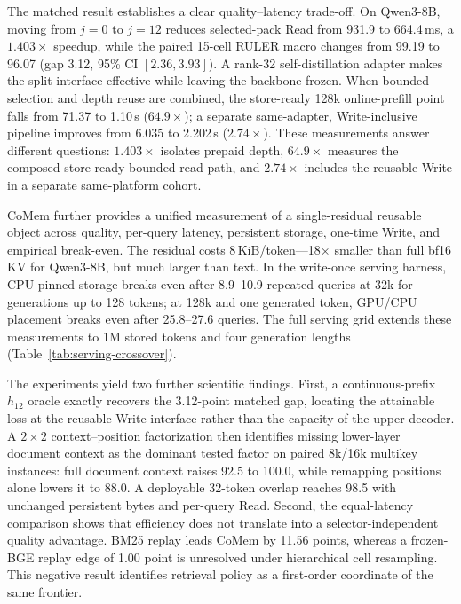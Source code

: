 The matched result establishes a clear quality--latency trade-off. On
Qwen3-8B, moving from $j{=}0$ to $j{=}12$ reduces selected-pack Read from
931.9 to 664.4\,ms, a $1.403\times$ speedup, while the paired 15-cell RULER
macro changes from 99.19 to 96.07 (gap 3.12, 95\% CI $[2.36,3.93]$). A
rank-32 self-distillation adapter makes the split interface effective while
leaving the backbone frozen. When bounded selection and depth reuse are
combined, the store-ready 128k online-prefill point falls from 71.37 to
1.10\,s ($64.9\times$); a separate same-adapter, Write-inclusive pipeline
improves from 6.035 to 2.202\,s ($2.74\times$). These measurements answer
different questions: $1.403\times$ isolates prepaid depth, $64.9\times$
measures the composed store-ready bounded-read path, and $2.74\times$ includes
the reusable Write in a separate same-platform cohort.

CoMem further provides a unified measurement of a
single-residual reusable object across quality, per-query latency, persistent
storage, one-time Write, and empirical break-even. The residual costs
8\,KiB/token---18$\times$ smaller than full bf16 KV for Qwen3-8B, but much
larger than text. In the write-once serving harness, CPU-pinned storage breaks
even after 8.9--10.9 repeated queries at 32k for generations up to 128 tokens;
at 128k and one generated token, GPU/CPU placement breaks even after
25.8--27.6 queries. The full serving grid extends these measurements to 1M
stored tokens and four generation lengths (Table~\ref{tab:serving-crossover}).

The experiments yield two further scientific findings. First, a
continuous-prefix $h_{12}$ oracle exactly recovers the 3.12-point matched gap,
locating the attainable loss at the reusable Write interface rather than the
capacity of the upper decoder. A $2{\times}2$ context--position factorization
then identifies missing lower-layer document context as the dominant tested
factor on paired 8k/16k multikey instances: full document context raises 92.5
to 100.0, while remapping positions alone lowers it to 88.0. A deployable
32-token overlap reaches 98.5 with unchanged persistent bytes and per-query
Read. Second, the equal-latency comparison shows that efficiency does not
translate into a selector-independent quality advantage. BM25 replay leads
CoMem by 11.56 points, whereas a frozen-BGE replay edge of 1.00 point is
unresolved under hierarchical cell resampling. This negative result identifies
retrieval policy as a first-order coordinate of the same frontier.

